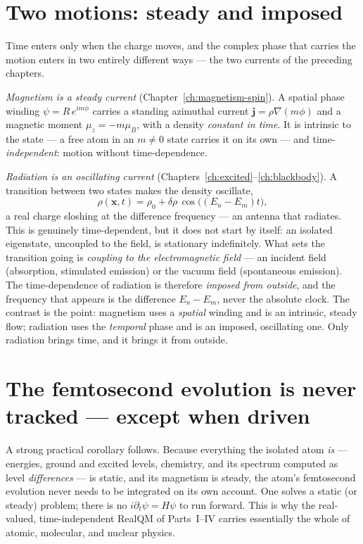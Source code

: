 \section{Two motions: steady and imposed}\label{sec:two-motions}

Time enters only when the charge moves, and the complex phase that carries the motion enters in two entirely
different ways --- the two currents of the preceding chapters.

\emph{Magnetism is a steady current} (Chapter~\ref{ch:magnetism-spin}). A spatial phase winding $\psi = R\,
e^{im\phi}$ carries a standing azimuthal current $\mathbf j = \rho\nabla(m\phi)$ and a magnetic moment
$\mu_z = -m\mu_B$, with a density \emph{constant in time}. It is intrinsic to the state --- a free atom in an
$m\neq0$ state carries it on its own --- and time-\emph{independent}: motion without time-dependence.

\emph{Radiation is an oscillating current} (Chapters~\ref{ch:excited}--\ref{ch:blackbody}). A transition
between two states makes the density oscillate,
\[
\rho(\mathbf x, t) = \rho_0 + \delta\rho\,\cos\big((E_n - E_m)t\big),
\]
a real charge sloshing at the difference frequency --- an antenna that radiates. This is genuinely
time-dependent, but it does not start by itself: an isolated eigenstate, uncoupled to the field, is stationary
indefinitely. What sets the transition going is \emph{coupling to the electromagnetic field} --- an incident
field (absorption, stimulated emission) or the vacuum field (spontaneous emission). The time-dependence of
radiation is therefore \emph{imposed from outside}, and the frequency that appears is the difference
$E_n - E_m$, never the absolute clock. The contrast is the point: magnetism uses a \emph{spatial} winding and is
an intrinsic, steady flow; radiation uses the \emph{temporal} phase and is an imposed, oscillating one. Only
radiation brings time, and it brings it from outside.

\section{The femtosecond evolution is never tracked --- except when driven}\label{sec:never-tracked}

A strong practical corollary follows. Because everything the isolated atom \emph{is} --- energies, ground and
excited levels, chemistry, and its spectrum computed as level \emph{differences} --- is static, and its
magnetism is steady, the atom's femtosecond evolution never needs to be integrated on its own account. One solves
a static (or steady) problem; there is no $i\partial_t\psi = H\psi$ to run forward. This is why the real-valued,
time-independent RealQM of Parts~I--IV carries essentially the whole of atomic, molecular, and nuclear physics.

